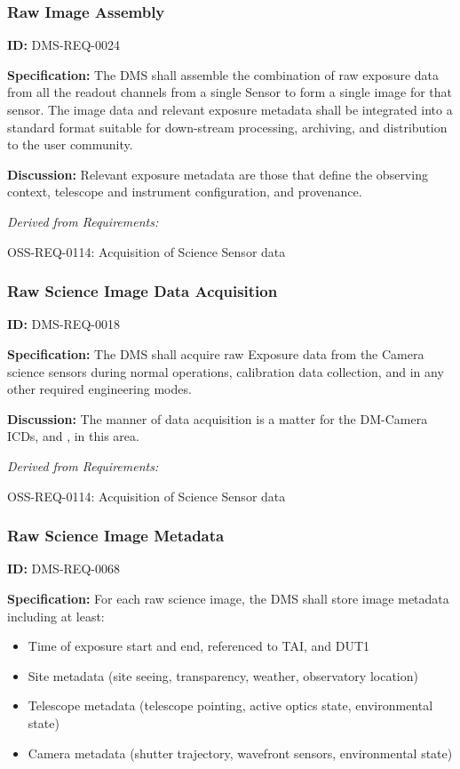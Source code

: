\documentclass[SE,toc,lsstdraft]{lsstdoc}
\begin{document}
\subsubsection{Raw Image Assembly}

\label{DMS-REQ-0024}
\textbf{ID:} DMS-REQ-0024

\textbf{Specification:} The DMS shall assemble the combination of raw exposure data from all the readout channels from a single Sensor to form a single image for that sensor. The image data and relevant exposure metadata shall be integrated into a standard format suitable for down-stream processing, archiving, and distribution to the user community.

\textbf{Discussion:} Relevant exposure metadata are those that define the observing context, telescope and instrument configuration, and provenance.




\emph{Derived from Requirements:}

OSS-REQ-0114:
Acquisition of Science Sensor data \newline


\subsubsection{Raw Science Image Data Acquisition}

\label{DMS-REQ-0018}
\textbf{ID:} DMS-REQ-0018

\textbf{Specification:} The DMS shall acquire raw Exposure data from the Camera science sensors during normal operations, calibration data collection, and in any other required engineering modes.

\textbf{Discussion:} The manner of data acquisition is a matter for the DM-Camera ICDs,  and , in this area.




\emph{Derived from Requirements:}

OSS-REQ-0114:
Acquisition of Science Sensor data \newline


\subsubsection{Raw Science Image Metadata}

\label{DMS-REQ-0068}
\textbf{ID:} DMS-REQ-0068

\textbf{Specification:} For each raw science image, the DMS shall store image metadata including at least:
\begin{itemize}
\item Time of exposure start and end, referenced to TAI, and DUT1
\item Site metadata (site seeing, transparency, weather, observatory location)
\item Telescope metadata (telescope pointing, active optics state, environmental state)
\item Camera metadata (shutter trajectory, wavefront sensors, environmental state)
\end{itemize}
\end{document}
